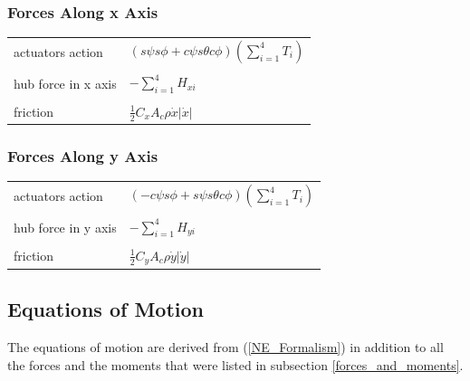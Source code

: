 \documentclass{thesisreport}
\begin{document}
\subsubsection*{Forces Along x Axis}
\setlength{\tabcolsep}{58pt}
 \begin{tabular}{lp{}}
actuators action & $ (s \psi s \phi + c \psi s \theta c \phi)(\sum_{i=1}^4 T_i) $\\
\\
hub force in x axis & $-\sum_{i=1}^4 H_{xi}$ \\
\\
friction & $\frac{1}{2}C_x A_c \rho \dot{x}|\dot{x}|$

\end{tabular}


\subsubsection*{Forces Along y Axis}
\setlength{\tabcolsep}{58pt}
 \begin{tabular}{lp{}}
actuators action & $ (-c \psi s \phi + s \psi s \theta c \phi)(\sum_{i=1}^4 T_i) $\\
\\
hub force in y axis & $-\sum_{i=1}^4 H_{yi}$ \\
\\
friction & $\frac{1}{2}C_y A_c \rho \dot{y}|\dot{y}|$

\end{tabular}

\subsection{Equations of Motion}\label{detail_equation_of_motin}

The equations of motion are derived from (\ref{NE_Formalism}) in addition to all the forces and the moments that were listed in subsection \ref{forces_and_moments}.
\end{document}
